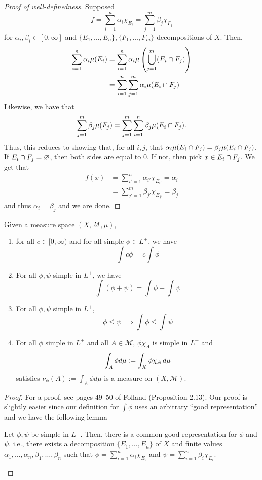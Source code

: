 \documentclass[11pt,leqno,oneside]{amsbook}
\numberwithin{thm}{section}
\newcommand{\M}{\mathcal{M}}
\renewcommand{\emptyset}{\varnothing}
\begin{document}
\begin{proof}[Proof of well-definedness]
  Supposed \[
    f = \sum_{i=1}^n \alpha_i \chi_{E_i} = \sum_{j=1}^m \beta_j \chi_{F_j}
  \]
  for $\alpha_i, \beta_i \in [0,\infty]$ and $\{E_1, \ldots, E_n\},
  \{F_1, \ldots, F_m\}$ decompositions of $X$. Then,
  \begin{align*}
    \sum_{i=1}^n \alpha_i \mu(E_i) & = \sum_{i=1}^n \alpha_i
                                     \mu \left(\bigcup_{j=1}^m (E_i
                                     \cap F_j)\right) \\
    & = \sum_{i=1}^n \sum_{j=1}^m \alpha_i \mu(E_i \cap F_j)
  \end{align*}
  Likewise, we have that \[
    \sum_{j=1}^m \beta_j \mu(F_j) = \sum_{j=1}^m \sum_{i=1}^n \beta_j
    \mu(E_i \cap F_j).
  \]
  Thus, this reduces to showing that, for all $i,j$, that $\alpha_i
  \mu(E_i \cap F_j) = \beta_j \mu(E_i \cap F_j)$. If $E_i
  \intersect F_j = \emptyset$, then both sides are equal to 0. If not,
  then pick $x \in E_i \cap F_j$. We get that
  \begin{align*}
    f(x) & = \sum_{i'=1}^n \alpha_{i'} \chi_{E_{i'}} = \alpha_i \\
    & = \sum_{j'=1}^m \beta_{j'} \chi_{E_{j'}} = \beta_j
  \end{align*}
  and thus $\alpha_i = \beta_j$ and we are done.
\end{proof}
\begin{prop}\label{integration-props}
  Given a measure space $(X,\M,\mu)$,
  \begin{enumerate}
  \item for all $c \in [0,\infty)$ and for all simple $\phi \in L^+$,
    we have \[
      \int c \phi = c \int \phi
    \]
  \item For all $\phi,\psi$ simple in $L^+$, we have \[
      \int (\phi+\psi) = \int \phi + \int \psi
    \]
  \item For all $\phi, \psi$ simple in $L^+$, \[
      \phi \leq \psi \implies \int \phi \leq \int \psi
    \]
  \item For all $\phi$ simple in $L^+$ and all $A \in \M$, $\phi
    \chi_A$ is simple in $L^+$ and \[
      \int_A \phi d \mu := \int_X \phi \chi_A \, d\mu
    \]
    satisfies $\nu_\phi(A) :=  \int_A \phi d \mu$ is a measure on $(X,\M)$.
  \end{enumerate}
\end{prop}
\begin{proof}
  For a proof, see pages 49--50 of Folland (Proposition 2.13). Our
  proof is slightly easier since our definition for $\int \phi$ uses
  an arbitrary ``good representation'' and we have the following lemma
  \begin{lem}
    Let $\phi,\psi$ be simple in $L^+$. Then, there is a common good
    representation for $\phi$ and $\psi$. i.e., there exists a
    decomposition $\{E_1, \ldots, E_n\}$ of $X$ and finite values
    $\alpha_1, \ldots, \alpha_n, \beta_1, \ldots, \beta_n$ such that
    $\phi = \sum_{i=1}^n \alpha_i \chi_{E_i}$ and $\psi = \sum_{i=1}^n
    \beta_i \chi_{E_i}$.
  \end{lem}
\end{proof}
\end{document}
